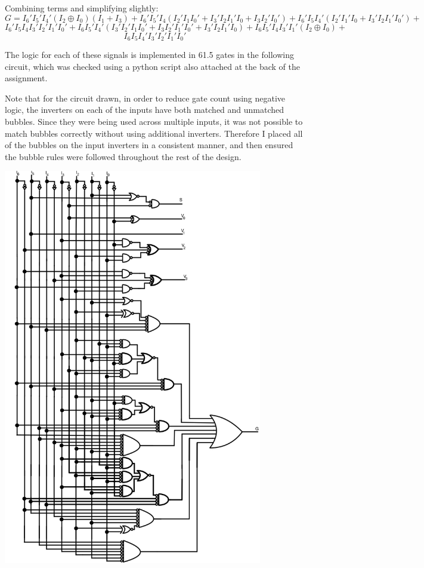 \documentclass{article}
\begin{document}
\begin{enumerate}
            Combining terms and simplifying slightly:
            \[G = I_6'I_5'I_4'(I_2 \oplus I_0)(I_1+I_3) + I_6'I_5'I_4(
                  I_2'I_1I_0' + I_3'I_2I_1'I_0 + I_3I_2'I_0') +
                  I_6'I_5I_4'(I_2'I_1'I_0 + I_3'I_2I_1'I_0') + \]\[
                  I_6'I_5I_4I_3'I_2'I_1'I_0' + I_6I_5'I_4'(I_3'I_2'I_1I_0' + 
                  I_3I_2'I_1'I_0' + I_3'I_2I_1'I_0) + I_6I_5'I_4I_3'I_1'(I_2
                  \oplus I_0) + \]\[I_6I_5I_4'I_3'I_2'I_1'I_0'\]

            The logic for each of these signals is implemented in 61.5 gates in
            the following circuit, which was checked using a python script also
            attached at the back of the assignment.

            Note that for the circuit drawn, in order to reduce gate count using
            negative logic, the inverters on each of the inputs have both matched
            and unmatched bubbles. Since they were being used across multiple
            inputs, it was not possible to match bubbles correctly without using
            additional inverters. Therefore I placed all of the bubbles on the 
            input inverters in a consistent manner, and then ensured the bubble
            rules were followed throughout the rest of the design.

            \begin{center}
                \includegraphics[width=0.85\textwidth]{figs/p1.jpeg}
            \end{center}


\end{enumerate}
\end{document}
